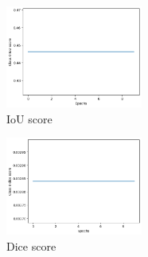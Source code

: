 \begin{figure}[htp!]
    \centering
    \includegraphics[width=0.4\textwidth]{Images/iou}
    \caption{IoU score}
    \label{fig:iou}
\end{figure}

\begin{figure}[!]
    \centering
    \includegraphics[width=0.4\textwidth]{Images/dice}
    \caption{Dice score}
    \label{fig:dice}
\end{figure}
